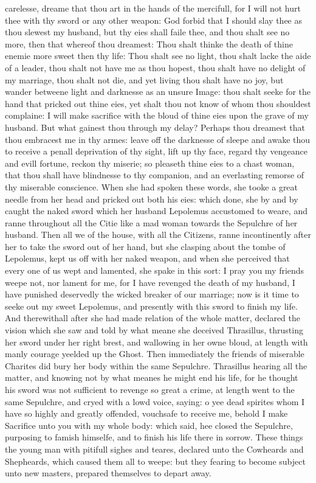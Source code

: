 carelesse, dreame that thou art in the hands of the mercifull, for I will not
hurt thee with thy sword or any other weapon: God forbid that I should slay
thee as thou slewest my husband, but thy eies shall faile thee, and thou shalt
see no more, then that whereof thou dreamest: Thou shalt thinke the death of
thine enemie more sweet then thy life: Thou shalt see no light, thou shalt
lacke the aide of a leader, thou shalt not have me as thou hopest, thou shalt
have no delight of my marriage, thou shalt not die, and yet living thou shalt
have no joy, but wander betweene light and darknesse as an unsure Image: thou
shalt seeke for the hand that pricked out thine eies, yet shalt thou not know
of whom thou shouldest complaine: I will make sacrifice with the bloud of thine
eies upon the grave of my husband. But what gainest thou through my delay?
Perhaps thou dreamest that thou embracest me in thy armes: leave off the
darknesse of sleepe and awake thou to receive a penall deprivation of thy
sight, lift up thy face, regard thy vengeance and evill fortune, reckon thy
miserie; so pleaseth thine eies to a chast woman, that thou shall have
blindnesse to thy companion, and an everlasting remorse of thy miserable
conscience. When she had spoken these words, she tooke a great needle from her
head and pricked out both his eies: which done, she by and by caught the naked
sword which her husband Lepolemus accustomed to weare, and ranne throughout all
the Citie like a mad woman towards the Sepulchre of her husband. Then all we of
the house, with all the Citizens, ranne incontinently after her to take the
sword out of her hand, but she clasping about the tombe of Lepolemus, kept us
off with her naked weapon, and when she perceived that every one of us wept and
lamented, she spake in this sort: I pray you my friends weepe not, nor lament
for me, for I have revenged the death of my husband, I have punished deservedly
the wicked breaker of our marriage; now is it time to seeke out my sweet
Lepolemus, and presently with this sword to finish my life. And therewithall
after she had made relation of the whole matter, declared the vision which she
saw and told by what meane she deceived Thrasillus, thrusting her sword under
her right brest, and wallowing in her owne bloud, at length with manly courage
yeelded up the Ghost. Then immediately the friends of miserable Charites did
bury her body within the same Sepulchre. Thrasillus hearing all the matter, and
knowing not by what meanes he might end his life, for he thought his sword was
not sufficient to revenge so great a crime, at length went to the same
Sepulchre, and cryed with a lowd voice, saying: o yee dead spirites whom I have
so highly and greatly offended, vouchsafe to receive me, behold I make
Sacrifice unto you with my whole body: which said, hee closed the Sepulchre,
purposing to famish himselfe, and to finish his life there in sorrow. These
things the young man with pitifull sighes and teares, declared unto the
Cowheards and Shepheards, which caused them all to weepe: but they fearing to
become subject unto new masters, prepared themselves to depart away.


